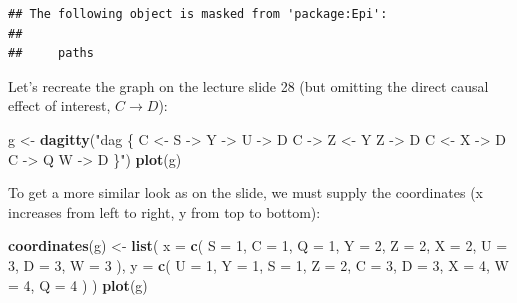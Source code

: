 \documentclass[
]{book}
\newenvironment{Shaded}{\begin{snugshade}}{\end{snugshade}}
\newcommand{\AttributeTok}[1]{\textcolor[rgb]{0.13,0.29,0.53}{#1}}
\newcommand{\DecValTok}[1]{\textcolor[rgb]{0.00,0.00,0.81}{#1}}
\newcommand{\FunctionTok}[1]{\textcolor[rgb]{0.13,0.29,0.53}{\textbf{#1}}}
\newcommand{\NormalTok}[1]{#1}
\newcommand{\OtherTok}[1]{\textcolor[rgb]{0.56,0.35,0.01}{#1}}
\newcommand{\StringTok}[1]{\textcolor[rgb]{0.31,0.60,0.02}{#1}}
\begin{document}
\begin{verbatim}
## The following object is masked from 'package:Epi':
## 
##     paths
\end{verbatim}

Let's recreate the graph on the lecture slide 28 (but omitting the direct causal effect of interest, \(C \rightarrow D\)):

\begin{Shaded}
\begin{Highlighting}[]
\NormalTok{g }\OtherTok{\textless{}{-}} \FunctionTok{dagitty}\NormalTok{(}\StringTok{"dag \{}
\StringTok{    C \textless{}{-} S {-}\textgreater{} Y {-}\textgreater{} U {-}\textgreater{} D}
\StringTok{    C {-}\textgreater{} Z \textless{}{-} Y}
\StringTok{    Z {-}\textgreater{} D}
\StringTok{    C \textless{}{-} X {-}\textgreater{} D}
\StringTok{    C {-}\textgreater{} Q}
\StringTok{    W {-}\textgreater{} D}
\StringTok{  \}"}\NormalTok{)}
\FunctionTok{plot}\NormalTok{(g)}
\end{Highlighting}
\end{Shaded}

To get a more similar look as on the slide, we must supply the coordinates (x increases from left to right, y from top to bottom):

\begin{Shaded}
\begin{Highlighting}[]
\FunctionTok{coordinates}\NormalTok{(g) }\OtherTok{\textless{}{-}} 
  \FunctionTok{list}\NormalTok{(}
    \AttributeTok{x =} 
      \FunctionTok{c}\NormalTok{(}
        \AttributeTok{S =} \DecValTok{1}\NormalTok{, }\AttributeTok{C =} \DecValTok{1}\NormalTok{, }\AttributeTok{Q =} \DecValTok{1}\NormalTok{, }\AttributeTok{Y =} \DecValTok{2}\NormalTok{, }\AttributeTok{Z =} \DecValTok{2}\NormalTok{, }
        \AttributeTok{X =} \DecValTok{2}\NormalTok{, }\AttributeTok{U =} \DecValTok{3}\NormalTok{, }\AttributeTok{D =} \DecValTok{3}\NormalTok{, }\AttributeTok{W =} \DecValTok{3}
\NormalTok{      ),}
    \AttributeTok{y =} 
      \FunctionTok{c}\NormalTok{(}
        \AttributeTok{U =} \DecValTok{1}\NormalTok{, }\AttributeTok{Y =} \DecValTok{1}\NormalTok{, }\AttributeTok{S =} \DecValTok{1}\NormalTok{, }\AttributeTok{Z =} \DecValTok{2}\NormalTok{, }\AttributeTok{C =} \DecValTok{3}\NormalTok{, }
        \AttributeTok{D =} \DecValTok{3}\NormalTok{, }\AttributeTok{X =} \DecValTok{4}\NormalTok{, }\AttributeTok{W =} \DecValTok{4}\NormalTok{, }\AttributeTok{Q =} \DecValTok{4}
\NormalTok{      )}
\NormalTok{  )}
\FunctionTok{plot}\NormalTok{(g)}
\end{Highlighting}
\end{Shaded}
\end{document}
